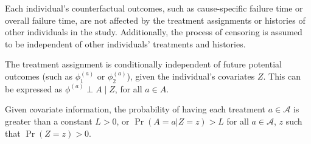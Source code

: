 \begin{assumption}
\label{assump:Causal1}
Each individual's counterfactual outcomes, such as cause-specific failure time or overall failure time, are not affected by the treatment assignments or histories of other individuals in the study. Additionally, the process of censoring is assumed to be independent of other individuals' treatments and histories.
\end{assumption}

\begin{assumption} %
\label{assump:Causal2}
The treatment assignment is conditionally independent of future potential outcomes (such as $\phi_1^{(a)}$ or $\phi_2^{(a)}$), given the individual's covariates $Z$. This can be expressed as $\phi^{(a)} \perp A \mid Z$, for all $a \in A$. 
\end{assumption}

\begin{assumption}[Positivity]
\label{assump:Causal3}
Given covariate information, the probability of having each treatment $a \in \mathcal{A}$ is greater than a constant $L > 0$, or $\Pr(A = a | Z = z) > L$ for all $a \in \mathcal{A}$, $z$ such that $\Pr(Z = z) > 0$.
\end{assumption}